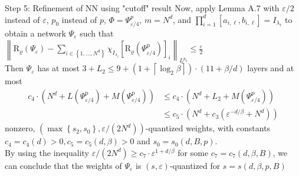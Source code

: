 \documentclass{if-beamer}
\begin{document}
\begin{frame}{Step 5: Refinement of NN using "cutoff" result}
    Now, apply Lemma A.7 with $\varepsilon/2$ instead of $\varepsilon$, $p_0$ instead of $p$, $\Phi = \Psi^p_{\varepsilon/4}$, $m=N^d$, and $\prod_{i=1}^{d}\left[a_{i, \ell}, b_{i, \ell}\right] = I_{\lambda_{\ell}}$ to obtain a network $\Psi_{\varepsilon}$ such that $\left\|\mathrm{R}_{\varrho}\left(\Psi_{\varepsilon}\right)-\sum_{i \in\left\{1, \ldots, N^{d}\right\}} \chi_{I_{\lambda_{i}}}\left[\mathrm{R}_{\varrho}\left(\Psi_{\varepsilon / 4}^{\mathrm{p}}\right)\right]_{i}\right\|_{L^{p_{0}}} \leq \frac{\varepsilon}{2}$\\
    Then $\Psi_{\varepsilon}$ has at most $3 + L_2 \leq 9 + \left(1+\left\lceil\log _{2} \beta\right\rceil\right)\cdot(11+\beta / d)$ layers and at most 
    \begin{align*}
        c_{4} \cdot\left(N^{d}+L\left(\Psi_{\varepsilon / 4}^{\mathrm{p}}\right)+M\left(\Psi_{\varepsilon / 4}^{\mathrm{p}}\right)\right) &\leq c_{4} \cdot\left(N^{d}+L_{2}+M\left(\Psi_{\varepsilon / 4}^{\mathrm{p}}\right)\right)\\ &\leq c_{5} \cdot\left(N^{d}+c_{3}\left(\varepsilon^{-d / \beta}+N^{d}\right)\right)
    \end{align*}
    nonzero, $\left(\max \left\{s_{2}, s_{0}\right\}, \varepsilon /\left(2 N^{d}\right)\right)$-quantized weights, with constants $c_{4}=c_{4}(d)>0, c_{5}=c_{5}(d, \beta)>0$ and $s_0=s_0(d,B,p)$.\\
    By using the inequality $\varepsilon/(2N^d) \geq c_7\cdot \varepsilon^{1+d/\beta}$ for some $c_7 = c_7(d,\beta,B)$, we can conclude that the weights of $\Psi_{\varepsilon}$ is $(s,\varepsilon)$-quantized for $s=s(d,\beta,p,B)$
\end{frame}
\end{document}
